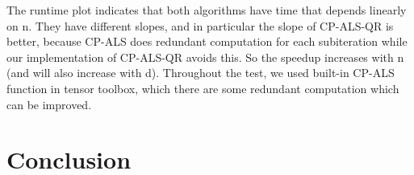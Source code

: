\documentclass{article}
\begin{document}
The runtime plot indicates that both algorithms have time that depends linearly on n.  
They have different slopes, and in particular the slope of CP-ALS-QR is better, 
because CP-ALS does redundant computation for each subiteration while our implementation 
of CP-ALS-QR avoids this.  So the speedup increases with n (and will also increase with d).
Throughout the test, we used built-in CP-ALS function in tensor toolbox, which there are some redundant computation 
which can be improved.




\section*{Conclusion}
\end{document}
